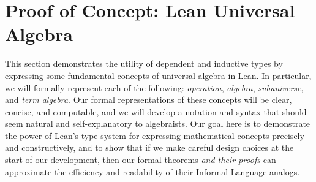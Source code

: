 \documentclass[11pt]{amsart}  %
\begin{document}









\section{Proof of Concept: Lean Universal Algebra}
\label{sec:proof-of-concept}

This section demonstrates the utility of dependent and inductive types 
by expressing some fundamental concepts of universal algebra in Lean.  
In particular, we will formally represent each of the following:  
\emph{operation}, \emph{algebra}, \emph{subuniverse}, and \emph{term algebra}.
Our formal representations of these concepts will be clear, concise, and computable, and we will develop a notation and syntax that should seem natural and self-explanatory to algebraists. Our goal here is to demonstrate the power of Lean's type system for expressing mathematical concepts precisely and constructively, and to show that if we make careful design choices at the start of our development, then our formal theorems \emph{and their proofs} can approximate the efficiency and readability of their Informal Language analogs.
\end{document}
